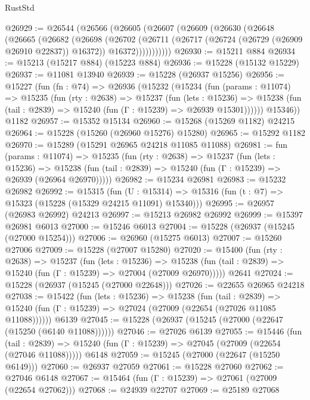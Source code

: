 \begin{lexlean}{RustStd}
\begin{coremodule}
@26929 := @26544
    (@26566
      (@26605
        (@26607
          (@26609
            (@26630
              (@26648
                (@26665
                  (@26682
                    (@26698
                      (@26702
                        (@26711
                          (@26717 (@26724 (@26729 (@26909 @26910 @22837)) @16372))
                          @16372)))))))))))
@26930 := @15211 @884
@26934 := @15213 (@15217 @884) (@15223 @884)
@26936 := @15228 (@15132 @15229)
@26937 := @11081 @13940
@26939 := @15228 (@26937 @15256)
@26956 := @15227
    (fun (fn : @74) =>
    @26936
      (@15232
        (@15234
          (fun (params : @11074) =>
          @15235
            (fun (rty : @2638) =>
            @15237
              (fun (lets : @15236) =>
              @15238 (fun (tail : @2839) => @15240 (fun (Γ : @15239) => @26939 @15301))))))
        @15346))
    @1182
@26957 := @15352 @15134
@26960 := @15268 (@15269 @1182) @24215
@26964 := @15228 (@15260 (@26960 @15276) @15280)
@26965 := @15292 @1182
@26970 := @15289 (@15291 @26965 @24218 @11085 @11088)
@26981 := fun (params : @11074) =>
  @15235
    (fun (rty : @2638) =>
    @15237
      (fun (lets : @15236) =>
      @15238 (fun (tail : @2839) => @15240 (fun (Γ : @15239) => @26939 (@26964 @26970)))))
@26982 := @15234 @26981
@26983 := @15232 @26982
@26992 := @15315
    (fun (U : @15314) => @15316 (fun (t : @7) => @15323 (@15228 (@15329 @24215 @11091) @15340)))
@26995 := @26957 (@26983 @26992) @24213
@26997 := @15213 @26982 @26992
@26999 := @15397 @26981 @6013
@27000 := @15246 @6013
@27004 := @15228 (@26937 (@15245 (@27000 @15254)))
@27006 := @26960 (@15275 @6013)
@27007 := @15260 @27006
@27009 := @15228 (@27007 @15280)
@27020 := @15400
    (fun (rty : @2638) =>
    @15237
      (fun (lets : @15236) =>
      @15238 (fun (tail : @2839) => @15240 (fun (Γ : @15239) => @27004 (@27009 @26970)))))
    @2641
@27024 := @15228 (@26937 (@15245 (@27000 @22648)))
@27026 := @22655 @26965 @24218
@27038 := @15422
    (fun (lets : @15236) =>
    @15238
      (fun (tail : @2839) =>
      @15240 (fun (Γ : @15239) => @27024 (@27009 (@22654 (@27026 @11085 @11088))))))
    @6139
@27045 := @15228 (@26937 (@15245 (@27000 (@22647 (@15250 (@6140 @11088))))))
@27046 := @27026 @6139
@27055 := @15446
    (fun (tail : @2839) => @15240 (fun (Γ : @15239) => @27045 (@27009 (@22654 (@27046 @11088)))))
    @6148
@27059 := @15245 (@27000 (@22647 (@15250 @6149)))
@27060 := @26937 @27059
@27061 := @15228 @27060
@27062 := @27046 @6148
@27067 := @15464 (fun (Γ : @15239) => @27061 (@27009 (@22654 @27062)))
@27068 := @24939 @22707
@27069 := @25189 @27068

\end{coremodule}
\end{lexlean}
